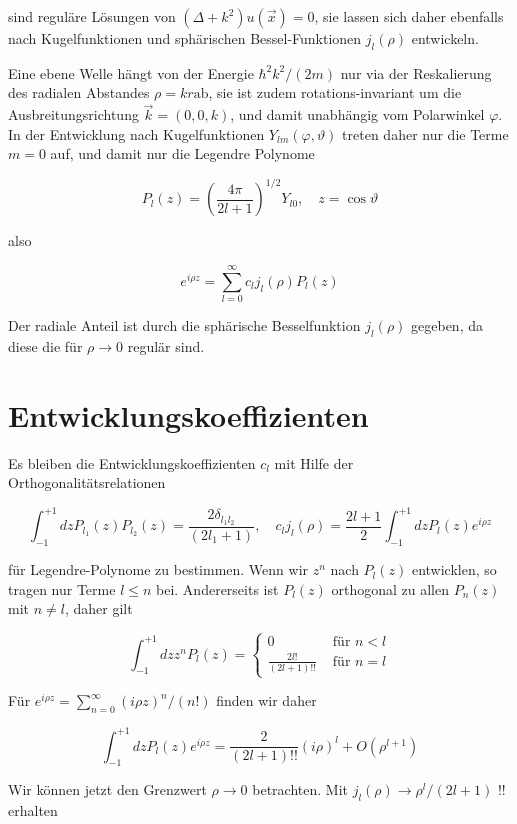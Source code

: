\documentclass[10pt, letterpaper]{article}
\begin{document}
sind reguläre Lösungen von $\left(\Delta+k^{2}\right) u(\vec{x})=0$, sie lassen sich daher ebenfalls nach Kugelfunktionen und sphärischen Bessel-Funktionen $j_{l}(\rho)$ entwickeln.

Eine ebene Welle hängt von der Energie $\hbar^{2} k^{2} /(2 m)$ nur via der Reskalierung des radialen Abstandes $\rho=k r \mathrm{ab}$, sie ist zudem rotations-invariant um die Ausbreitungsrichtung $\vec{k}=(0,0, k)$, und damit unabhängig vom Polarwinkel $\varphi$. In der Entwicklung nach Kugelfunktionen $Y_{l m}(\varphi, \vartheta)$ treten daher nur die Terme $m=0$ auf, und damit nur die Legendre Polynome

$$
P_{l}(z)=\left(\frac{4 \pi}{2 l+1}\right)^{1 / 2} Y_{l 0}, \quad z=\cos \vartheta
$$

also

$$
e^{i \rho z}=\sum_{l=0}^{\infty} c_{l} j_{l}(\rho) P_{l}(z)
$$

Der radiale Anteil ist durch die sphärische Besselfunktion $j_{l}(\rho)$ gegeben, da diese die für $\rho \rightarrow 0$ regulär sind.

\section*{Entwicklungskoeffizienten}
Es bleiben die Entwicklungskoeffizienten $c_{l}$ mit Hilfe der Orthogonalitätsrelationen

$$
\int_{-1}^{+1} d z P_{l_{1}}(z) P_{l_{2}}(z)=\frac{2 \delta_{l_{1} l_{2}}}{\left(2 l_{1}+1\right)}, \quad c_{l} j_{l}(\rho)=\frac{2 l+1}{2} \int_{-1}^{+1} d z P_{l}(z) e^{i \rho z}
$$

für Legendre-Polynome zu bestimmen. Wenn wir $z^{n}$ nach $P_{l}(z)$ entwicklen, so tragen nur Terme $l \leq n$ bei. Andererseits ist $P_{l}(z)$ orthogonal zu allen $P_{n}(z)$ mit $n \neq l$, daher gilt

$$
\int_{-1}^{+1} d z z^{n} P_{l}(z)=\left\{\begin{array}{cc}
0 & \text { für } n<l \\
\frac{2 l!}{(2 l+1)!!} & \text { für } n=l
\end{array}\right.
$$

Für $e^{i \rho z}=\sum_{n=0}^{\infty}(i \rho z)^{n} /(n!)$ finden wir daher

$$
\int_{-1}^{+1} d z P_{l}(z) e^{i \rho z}=\frac{2}{(2 l+1)!!}(i \rho)^{l}+O\left(\rho^{l+1}\right)
$$

Wir können jetzt den Grenzwert $\rho \rightarrow 0$ betrachten. Mit $j_{l}(\rho) \rightarrow \rho^{l} /(2 l+1)$ !! erhalten
\end{document}

